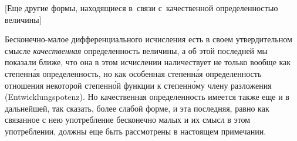 \bigskip

%
{[Еще другие формы, находящиеся в~связи с~качественной
определенностью величины]}

\label{bkm:bm53a}
Бесконечно-малое дифференциального исчисления есть в своем утвердительном
смысле {\em качественная} определенность величины, а об этой последней мы
показали ближе, что она в этом исчислении наличествует не только вообще как
степенн\'{а}я определенность, но как особенная степенн\'{а}я определенность
отношения некоторой степенн\'{о}й функции к степенн\'{о}му члену разложения
(Ent\-wick\-lungs\-potenz). Но качественная
определенность имеется также еще и в дальнейшей, так сказать, более слабой
форме, и эта последняя, равно как связанное с нею употребление бесконечно малых
и их смысл в этом употреблении, должны еще быть рассмотрены в настоящем
примечании.

